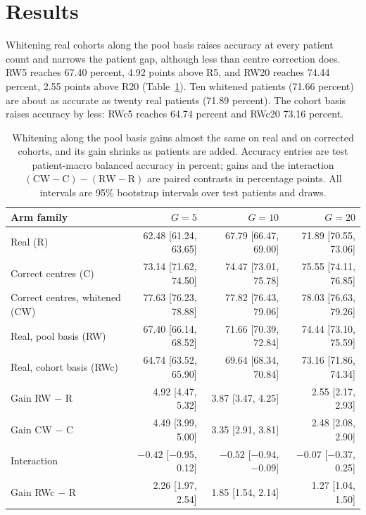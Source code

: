 \documentclass[11pt]{article}
\begin{document}
\section{Results}
\label{sec:results}
Whitening real cohorts along the pool basis raises accuracy at every patient count and narrows the patient gap, although less than centre correction does. RW5 reaches 67.40 percent, 4.92 points above R5, and RW20 reaches 74.44 percent, 2.55 points above R20 (Table~\ref{tab:accuracy}). Ten whitened patients (71.66 percent) are about as accurate as twenty real patients (71.89 percent). The cohort basis raises accuracy by less: RWc5 reaches 64.74 percent and RWc20 73.16 percent.

\begin{table}[htbp]
\centering
\small
\renewcommand{\arraystretch}{1.15}
\begin{tabular}{@{}lrrr@{}}
\toprule
Arm family & $G=5$ & $G=10$ & $G=20$ \\
\midrule
Real (R) & 62.48 [61.24, 63.65] & 67.79 [66.47, 69.00] & 71.89 [70.55, 73.06] \\
Correct centres (C) & 73.14 [71.62, 74.50] & 74.47 [73.01, 75.78] & 75.55 [74.11, 76.85] \\
Correct centres, whitened (CW) & 77.63 [76.23, 78.88] & 77.82 [76.43, 79.06] & 78.03 [76.63, 79.26] \\
Real, pool basis (RW) & 67.40 [66.14, 68.52] & 71.66 [70.39, 72.84] & 74.44 [73.10, 75.59] \\
Real, cohort basis (RWc) & 64.74 [63.52, 65.90] & 69.64 [68.34, 70.84] & 73.16 [71.86, 74.34] \\
\addlinespace
Gain RW $-$ R & 4.92 [4.47, 5.32] & 3.87 [3.47, 4.25] & 2.55 [2.17, 2.93] \\
Gain CW $-$ C & 4.49 [3.99, 5.00] & 3.35 [2.91, 3.81] & 2.48 [2.08, 2.90] \\
Interaction & $-0.42$ [$-0.95$, 0.12] & $-0.52$ [$-0.94$, $-0.09$] & $-0.07$ [$-0.37$, 0.25] \\
Gain RWc $-$ R & 2.26 [1.97, 2.54] & 1.85 [1.54, 2.14] & 1.27 [1.04, 1.50] \\
\bottomrule
\end{tabular}
\caption{Whitening along the pool basis gains almost the same on real and on corrected cohorts, and its gain shrinks as patients are added. Accuracy entries are test patient-macro balanced accuracy in percent; gains and the interaction $(\mathrm{CW}-\mathrm C)-(\mathrm{RW}-\mathrm R)$ are paired contrasts in percentage points. All intervals are 95\% bootstrap intervals over test patients and draws.}
\label{tab:accuracy}
\end{table}
\end{document}
